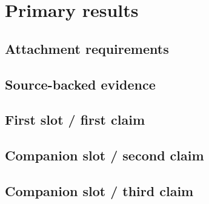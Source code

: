 \section{Primary results}\label{sec:primary-results}


\subsection{Attachment requirements}\label{subsec:attachment-requirements}


\subsection{Source-backed evidence}\label{subsec:source-backed-evidence}


\subsection{First slot / first claim}\label{subsec:first-claim}


\subsection{Companion slot / second claim}\label{subsec:second-claim}


\subsection{Companion slot / third claim}\label{subsec:third-claim}


